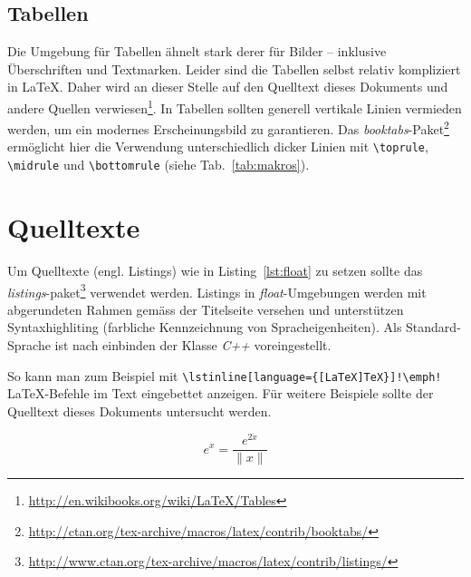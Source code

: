 \documentclass[english,ngerman]{KITreprt}
\begin{document}
\subsection{Tabellen}
Die Umgebung f\"ur Tabellen \"ahnelt stark derer f\"ur Bilder -- inklusive \"Uberschriften und Textmarken.
Leider sind die Tabellen selbst relativ kompliziert in \LaTeX.
Daher wird an dieser Stelle auf den Quelltext dieses Dokuments und andere Quellen verwiesen\footnote{\url{http://en.wikibooks.org/wiki/LaTeX/Tables}}.
In Tabellen sollten generell vertikale Linien vermieden werden, um ein modernes Erscheinungsbild zu garantieren.
Das \emph{booktabs}-Paket\footnote{\url{http://ctan.org/tex-archive/macros/latex/contrib/booktabs/}} erm\"oglicht hier die Verwendung unterschiedlich dicker Linien mit \texttt{\textbackslash toprule},
\texttt{\textbackslash midrule} und \texttt{\textbackslash bottomrule} (siehe Tab.~\ref{tab:makros}). 


\section{Quelltexte}\label{sec:code}
Um Quelltexte (engl. Listings) wie in Listing~\ref{lst:float} zu setzen sollte das \emph{listings}-paket\footnote{\url{http://www.ctan.org/tex-archive/macros/latex/contrib/listings/}} verwendet werden.
Listings in \emph{float}-Umgebungen werden mit abgerundeten Rahmen gem\"ass der Titelseite versehen und unterst\"utzen Syntaxhighliting (farbliche Kennzeichnung von Spracheigenheiten).
Als Standard-Sprache ist nach einbinden der Klasse \emph{C++} voreingestellt.

So kann man zum Beispiel mit \lstinline[language={[LaTeX]TeX}]-\lstinline[language={[LaTeX]TeX}]!\emph!- \LaTeX-Befehle im Text eingebettet anzeigen.
F\"ur weitere Beispiele sollte der Quelltext dieses Dokuments untersucht werden.

\begin{equation}
e^x = \frac{e^{2\dot x} }{ \| x \|}
\end{equation}
\end{document}
